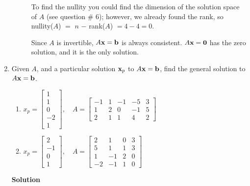 \begin{enumerate}
\begin{description}
\noindent To find the nullity you could find the dimension of the
solution space of $A$ (see question \# 6); however, we already
found the rank, so nullity($A$) $=$ $n$ $-$ rank($A$) $=4-4=0$.

Since $A$ is invertible, $A{\bf x}={\bf b}$ is always consistent.
$A{\bf x}={\bf 0}$ has the zero solution, and it is the only
solution.
\end{description}

\item Given $A$, and a particular solution ${\bf x}_p$ to $A{\bf
x}={\bf b}$, find the general solution to $A{\bf x}={\bf b}$.
\begin{enumerate}
\item $x_p=\left [ \begin{array}{r}  1\\ 1\\ 0\\-2\\ 1 \end{array} \right ],
\quad A=\left [ \begin{array}{rrrrr} -1&1&-1&-5&3\\ 1&2&0&-1&5\\
2&1&1&4&2 \end{array} \right ]$
\item $x_p=\left [ \begin{array}{r} 2\\-1\\ 0\\1 \end{array} \right ], \quad
A=\left [ \begin{array}{rrrr} 2&1&0&3\\ 5&1&1&3\\1&-1&2&0\\
-2&-1&1&0
\end{array} \right ]$

\end{enumerate}

\noindent \textbf{Solution} 
\end{enumerate}
